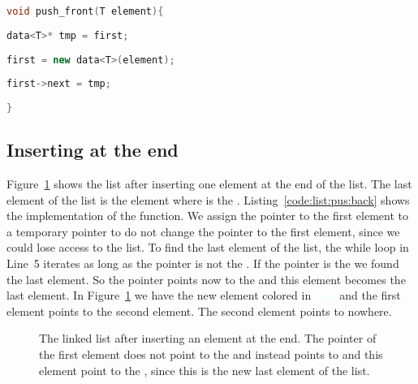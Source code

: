 \begin{lstlisting}[language=c++,caption={Implementation of the \cpp{push_back} function of a linked list.\label{code:list:push:front}},float,floatplacement=tb]
void push_front(T element){
    
data<T>* tmp = first;
    
first = new data<T>(element);
    
first->next = tmp; 
    
}
\end{lstlisting}

\subsection*{Inserting at the end}

Figure~\ref{fig:sketch:linked:list:push_back} shows the list after inserting one element at the end of the list. The last element of the list is the element where  is the . Listing~\ref{code:list:pus:back} shows the implementation of the  function. We assign the pointer to the first element to a temporary pointer  to do not change the pointer to the first element, since we could lose access to the list. To find the last element of the list, the while loop in Line~5 iterates as long as the  pointer is not the . If the  pointer is the  we found the last element. So the  pointer points now to the  and this element becomes the last element. In Figure~\ref{fig:sketch:linked:list:push_back} we have the new element colored in \textcolor{azure}{blue} and the first element points to the second element. The second element points to nowhere.

\begin{figure}[h]
\centering
{}
\caption{The linked list after inserting an element at the end. The pointer  of the first element does not point to the  and instead points to  and this element point to the , since this is the new last element of the list.}
\label{fig:sketch:linked:list:push_back}
\end{figure}

